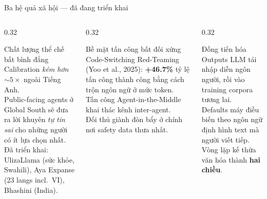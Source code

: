 \documentclass[11pt,aspectratio=169]{beamer}
\begin{document}
\begin{frame}{Ba hệ quả xã hội --- đã đang triển khai}
    \large
    \begin{columns}[T]
        \begin{column}{0.32\textwidth}
            \begin{alertblock}{Chất lượng thể chế bất bình đẳng}
                \footnotesize Calibration \emph{kém hơn $\sim 5\times$} ngoài Tiếng Anh.\\[4pt]
                Public-facing agents ở Global South sẽ đưa ra lời khuyên \emph{tự tin sai} cho những người có ít lựa chọn nhất.\\[4pt]
                Đã triển khai: UlizaLlama (sức khỏe, Swahili), Aya Expanse (23 langs incl.\ VI), Bhashini (India).
            \end{alertblock}
        \end{column}
        \begin{column}{0.32\textwidth}
            \begin{alertblock}{Bề mặt tấn công bất đối xứng}
                \footnotesize Code-Switching Red-Teaming (Yoo et al., 2025): \textbf{+46.7\%} tỷ lệ tấn công thành công bằng cách trộn ngôn ngữ ở mức token.\\[4pt]
                Tấn công Agent-in-the-Middle khai thác kênh inter-agent.\\[4pt]
                Đối thủ giành đòn bẩy ở chính nơi safety data thưa nhất.
            \end{alertblock}
        \end{column}
        \begin{column}{0.32\textwidth}
            \begin{alertblock}{Đồng tiến hóa}
                \footnotesize Outputs LLM tái nhập diễn ngôn người, rồi vào training corpora tương lai.\\[4pt]
                Defaults máy điều biến theo ngôn ngữ định hình text mà người viết tiếp.\\[4pt]
                Vòng lặp kế thừa văn hóa thành \textbf{hai chiều}.
            \end{alertblock}
        \end{column}
    \end{columns}
\end{frame}
\end{document}
